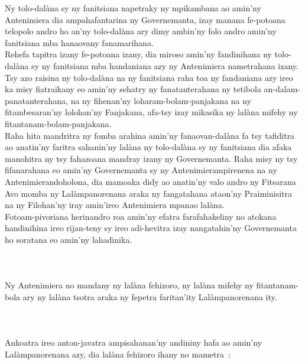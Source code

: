 \documentclass[12pt]{article}
\newcounter{laharana}
\newcommand{\andininy}[0]{
  \paragraph{%
    \NoCaseChange{%
      Andininy~\addtocounter{laharana}{1}\thelaharana.}\label{and:\thelaharana}~%
  }%
}
\begin{document}
\noindent
Ny tolo-dalàna sy ny fanitsiana napetraky ny mpikambana ao amin'ny Antenimiera
dia ampahafantarina ny Governemanta, izay manana fe-potoana telopolo andro ho
an'ny tolo-dalàna ary dimy ambin'ny folo andro amin'ny fanitsiana mba hanaovany
fanamarihana.\\

\noindent
Rehefa tapitra izany fe-potoana izany, dia miroso amin'ny fandinihana ny
tolo-dalàna sy ny fanitsiana mba handaniana azy ny Antenimiera nametrahana
izany.\\

\noindent
Tsy azo raisina ny tolo-dalàna na ny fanitsiana raha toa ny fandaniana azy ireo
ka misy fiatraikany eo amin'ny sehatry ny fanatanterahana ny tetibola
an-dalam-panatanterahana, na ny fihenan'ny loharam-bolam-panjakana na ny
fitambesaran'ny lolohan'ny Fanjakana, afa-tsy izay mikasika ny lalàna mifehy ny
fitantanam-bolam-panjakana.\\

\noindent
Raha hita mandritra ny fomba arahina amin'ny fanaovan-dalàna fa tsy tafiditra ao
anatin'ny faritra sahanin'ny lalàna ny tolo-dalàna sy ny fanitsiana dia afaka
manohitra ny tsy fahazoana mandray izany ny Governemanta. Raha misy ny tsy
fifanarahana eo amin'ny Governemanta sy ny Antenimierampirenena na ny
Antenimierandoholona, dia mamoaka didy ao anatin'ny valo andro ny Fitsarana Avo
momba ny Lalàmpanorenana araka ny fangatahana ataon'ny Praiminisitra na ny
Filohan'ny iray amin'ireo Antenimiera mpanao lalàna.\\

\noindent
Fotoam-pivoriana herinandro roa amin'ny efatra farafahakeliny no atokana
handinihina ireo rijan-teny sy ireo adi-hevitra izay nangatahin'ny Governemanta
ho soratana eo amin'ny lahadinika.

\andininy{}Ny Antenimiera no mandany ny lalàna fehizoro, ny lalàna mifehy ny
fitantanam-bola ary ny lalàna tsotra araka ny fepetra faritan'ity
Lalàmpanorenana ity.

\andininy{}Ankoatra ireo anton-javatra ampisahanan'ny andininy hafa ao amin'ny
Lalàmpanorenana azy, dia lalàna fehizoro ihany no mametra~:
\end{document}
